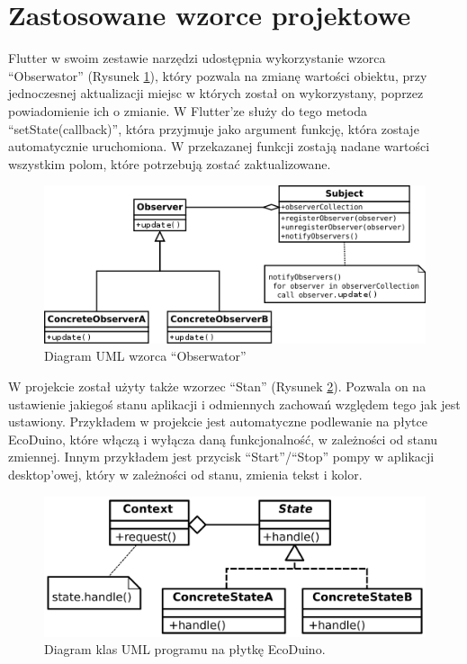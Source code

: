 \documentclass[a4paper,twoside,12pt]{book}
\begin{document}
\section{Zastosowane wzorce projektowe}

Flutter w swoim zestawie narzędzi udostępnia wykorzystanie wzorca ``Obserwator'' (Rysunek \ref{fig:19}), który pozwala na zmianę wartości obiektu, przy jednoczesnej aktualizacji miejsc w których został on wykorzystany, poprzez powiadomienie ich o zmianie. W Flutter'ze służy do tego metoda ``setState(callback)'', która przyjmuje jako argument funkcję, która zostaje automatycznie uruchomiona. W przekazanej funkcji zostają nadane wartości wszystkim polom, które potrzebują zostać zaktualizowane.

\begin{figure}[H]
   \centering
   \includegraphics[width=\textwidth]{./assets/img/img019.png}
   \caption{Diagram UML wzorca ``Obserwator'' \cite{bib:url008}}
   \label{fig:19}
\end{figure}

\newpage

W projekcie został użyty także wzorzec ``Stan'' (Rysunek \ref{fig:20}). Pozwala on na ustawienie jakiegoś stanu aplikacji i odmiennych zachowań względem tego jak jest ustawiony. Przykładem w projekcie jest automatyczne podlewanie na płytce EcoDuino, które włączą i wyłącza daną funkcjonalność, w zależności od stanu zmiennej. Innym przykładem jest przycisk ``Start''/``Stop'' pompy w aplikacji desktop'owej, który w zależności od stanu, zmienia tekst i kolor.

\begin{figure}[H]
   \centering
   \includegraphics[width=\textwidth]{./assets/img/img020.png}
   \caption{Diagram klas UML programu na płytkę EcoDuino.}
   \label{fig:20}
\end{figure}
\end{document}
